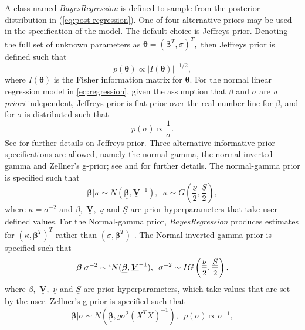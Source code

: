 \documentclass[article]{jss}
\begin{document}
A class named \emph{BayesRegression }is defined to sample from the
posterior distribution in (\ref{eq:post regression}). One of four
alternative priors may be used in the specification of the model.  The
default choice is Jeffreys prior. Denoting the full set of unknown
parameters as $\bm{\theta}=(\bm{\beta}^{T},\sigma)^{T},$ then
Jeffreys prior is defined such that \begin{equation}
  p(\bm{\theta})\propto|I(\bm{\theta})|^{-1/2},\label{eq:Jeffrey's
    Prior}
\end{equation} where $I(\bm{\theta})$ is the Fisher
	information matrix for $\bm{\theta}.$ For the normal linear
	regression model in \ref{eq:regression}, given the assumption that $\beta$
	and $\sigma$ are \emph{a priori} independent, Jeffreys prior is flat prior over the 
	real number line for $\beta$, and for $\sigma$ is distributed such that 
\begin{equation}
		p\left(\sigma\right)\propto\frac{1}{\sigma}.
\end{equation}
		See \cite{Zellner1971} for further details on Jeffreys prior. Three alternative informative
prior specifications are allowed, namely the normal-gamma, the
normal-inverted-gamma and Zellner's g-prior; see \cite{Zellner1971} and \cite{MarinRobert2007}
for further details.  The normal-gamma prior is
specified such that\begin{equation} 
\bm{\beta}|\kappa\sim
  N(\bm{\underline{\beta}},\underline{\bm{V}}^{-1}),\,\,\,\kappa\sim
  G\left(\frac{\underline{\nu}}{2},\frac{\underline{S}}{2}\right),\label{eq:Normal
    Gamma}\end{equation} 
where $\kappa=\sigma^{-2}$ and
$\underline{\beta,}$ $\underline{\bm{V}},$ $\underline{\nu}$ and
$\underline{S}$ are prior hyperparameters that take user defined
values. For the Normal-gamma prior, \emph{BayesRegression }produces
estimates for\emph{ $\left(\kappa,\bm{\beta}^{T}\right)^{T}$ }rather
than $\left(\sigma,\bm{\beta}^{T}\right)$ . The Normal-inverted gamma
prior is specified such that
\begin{equation}
  \bm{\beta}|\sigma^{-2}\sim`
  N(\bm{\underline{\beta}},\underline{\bm{V}}^{-1}),\,\,\,\sigma^{-2}\sim
  IG\left(\frac{\underline{\nu}}{2},\frac{\underline{S}}{2}\right),\label{eq:Normal
    Inverted Gamma}
\end{equation} 
where $\underline{\beta,}$
$\underline{\bm{V}},$ $\underline{\nu}$ and $\underline{S}$ are prior
hyperparameters, which take values that are set by the user. Zellner's
g-prior is specified such that
\begin{equation} \bm{\beta}|\sigma\sim
  N\left(\underline{\bm{\beta}},g\sigma^{2}\left(X^{T}X\right)^{-1}\right),\,\,\,
  p(\sigma)\propto\sigma^{-1},\label{eq:g-prior}
\end{equation}
\end{document}
